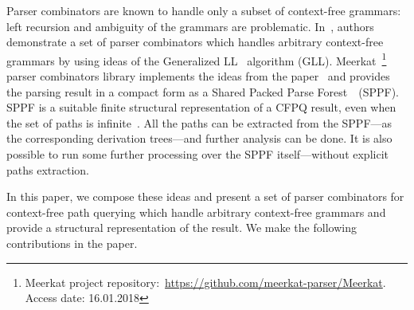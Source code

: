 Parser combinators are known to handle only a subset of context-free grammars: left recursion and ambiguity of the grammars are problematic. 
In~\cite{Meerkat}, authors demonstrate a set of parser combinators which handles arbitrary context-free grammars by using ideas of the Generalized LL~\cite{scott2010gll} algorithm (GLL). 
Meerkat~\footnote{Meerkat project repository:~\url{https://github.com/meerkat-parser/Meerkat}. Access date: 16.01.2018} parser combinators library implements the ideas from the paper~\cite{Meerkat} and provides the parsing result in a compact form as a Shared Packed Parse Forest~\cite{SPPF}~(SPPF).
SPPF is a suitable finite structural representation of a CFPQ result, even when the set of paths is infinite~\cite{GrigorevR16}. 
All the paths can be extracted from the SPPF---as the corresponding derivation trees---and further analysis can be done. 
It is also possible to run some further processing over the SPPF itself---without explicit paths extraction.


In this paper, we compose these ideas and present a set of parser combinators for context-free path querying which handle arbitrary context-free grammars and provide a structural representation of the result. 
We make the following contributions in the paper.


